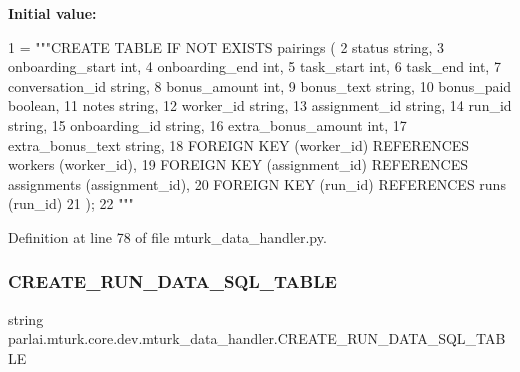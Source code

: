 {\bfseries Initial value\+:}
\begin{DoxyCode}
1 =  \textcolor{stringliteral}{"""CREATE TABLE IF NOT EXISTS pairings (}
2 \textcolor{stringliteral}{        status string,}
3 \textcolor{stringliteral}{        onboarding\_start int,}
4 \textcolor{stringliteral}{        onboarding\_end int,}
5 \textcolor{stringliteral}{        task\_start int,}
6 \textcolor{stringliteral}{        task\_end int,}
7 \textcolor{stringliteral}{        conversation\_id string,}
8 \textcolor{stringliteral}{        bonus\_amount int,}
9 \textcolor{stringliteral}{        bonus\_text string,}
10 \textcolor{stringliteral}{        bonus\_paid boolean,}
11 \textcolor{stringliteral}{        notes string,}
12 \textcolor{stringliteral}{        worker\_id string,}
13 \textcolor{stringliteral}{        assignment\_id string,}
14 \textcolor{stringliteral}{        run\_id string,}
15 \textcolor{stringliteral}{        onboarding\_id string,}
16 \textcolor{stringliteral}{        extra\_bonus\_amount int,}
17 \textcolor{stringliteral}{        extra\_bonus\_text string,}
18 \textcolor{stringliteral}{        FOREIGN KEY (worker\_id) REFERENCES workers (worker\_id),}
19 \textcolor{stringliteral}{        FOREIGN KEY (assignment\_id) REFERENCES assignments (assignment\_id),}
20 \textcolor{stringliteral}{        FOREIGN KEY (run\_id) REFERENCES runs (run\_id)}
21 \textcolor{stringliteral}{    );}
22 \textcolor{stringliteral}{    """}
\end{DoxyCode}


Definition at line 78 of file mturk\+\_\+data\+\_\+handler.\+py.

\mbox{\label{namespaceparlai_1_1mturk_1_1core_1_1dev_1_1mturk__data__handler_abe357c7a65e8a413b229727b750facf3}} 
\subsubsection{\texorpdfstring{C\+R\+E\+A\+T\+E\+\_\+\+R\+U\+N\+\_\+\+D\+A\+T\+A\+\_\+\+S\+Q\+L\+\_\+\+T\+A\+B\+LE}{CREATE\_RUN\_DATA\_SQL\_TABLE}}
{\footnotesize\ttfamily string parlai.\+mturk.\+core.\+dev.\+mturk\+\_\+data\+\_\+handler.\+C\+R\+E\+A\+T\+E\+\_\+\+R\+U\+N\+\_\+\+D\+A\+T\+A\+\_\+\+S\+Q\+L\+\_\+\+T\+A\+B\+LE}

